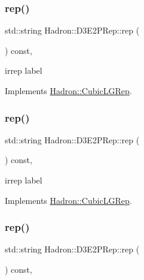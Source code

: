 \subsubsection{\texorpdfstring{rep()}{rep()}\hspace{0.1cm}{\footnotesize\ttfamily [1/3]}}
{\footnotesize\ttfamily std\+::string Hadron\+::\+D3\+E2\+P\+Rep\+::rep (\begin{DoxyParamCaption}{ }\end{DoxyParamCaption}) const\hspace{0.3cm}{\ttfamily [inline]}, {\ttfamily [virtual]}}

irrep label 

Implements \mbox{\hyperlink{structHadron_1_1CubicLGRep_a50f5ddbb8f4be4cee0106fa9e8c75e6c}{Hadron\+::\+Cubic\+L\+G\+Rep}}.

\mbox{\label{structHadron_1_1D3E2PRep_aac98f22bbc3837857380501e2fd81b44}} 
\subsubsection{\texorpdfstring{rep()}{rep()}\hspace{0.1cm}{\footnotesize\ttfamily [2/3]}}
{\footnotesize\ttfamily std\+::string Hadron\+::\+D3\+E2\+P\+Rep\+::rep (\begin{DoxyParamCaption}{ }\end{DoxyParamCaption}) const\hspace{0.3cm}{\ttfamily [inline]}, {\ttfamily [virtual]}}

irrep label 

Implements \mbox{\hyperlink{structHadron_1_1CubicLGRep_a50f5ddbb8f4be4cee0106fa9e8c75e6c}{Hadron\+::\+Cubic\+L\+G\+Rep}}.

\mbox{\label{structHadron_1_1D3E2PRep_aac98f22bbc3837857380501e2fd81b44}} 
\subsubsection{\texorpdfstring{rep()}{rep()}\hspace{0.1cm}{\footnotesize\ttfamily [3/3]}}
{\footnotesize\ttfamily std\+::string Hadron\+::\+D3\+E2\+P\+Rep\+::rep (\begin{DoxyParamCaption}{ }\end{DoxyParamCaption}) const\hspace{0.3cm}{\ttfamily [inline]}, {\ttfamily [virtual]}}

